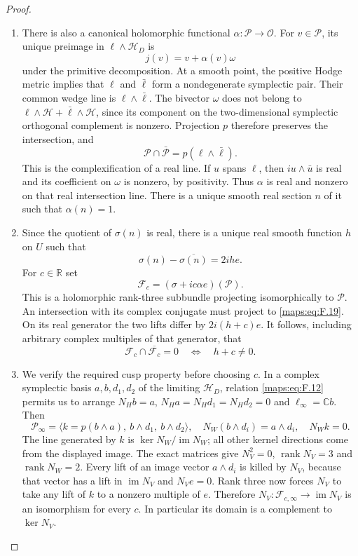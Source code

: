 \documentclass[11pt,a4paper]{article}
\theoremstyle{definition}
\begin{document}
\begin{proof}
\begin{enumerate}[label=\arabic*.]
\item There is also a canonical holomorphic functional
$\alpha:\mathcal P\to\mathcal O$.
For $v\in\mathcal P$, its unique preimage in
$\ell\wedge\mathcal H_D$ is
\[
 j(v)=v+\alpha(v)\omega
 \tag{F.18}\label{maps:eq:F.18}
\]
under the primitive decomposition.
At a smooth point, the positive Hodge metric implies that
$\ell$ and $\bar\ell$ form a nondegenerate symplectic pair.
Their common wedge line is $\ell\wedge\bar\ell$.
The bivector $\omega$ does not belong to
$\ell\wedge\mathcal H+\bar\ell\wedge\mathcal H$, since its
component on the two-dimensional symplectic orthogonal complement
is nonzero.  Projection $p$ therefore preserves the intersection,
and
\[
 \mathcal P\cap\bar{\mathcal P}
      =p(\ell\wedge\bar\ell).
 \tag{F.19}\label{maps:eq:F.19}
\]
This is the complexification of a real line.  If $u$ spans
$\ell$, then $i u\wedge\bar u$ is real and its coefficient on
$\omega$ is nonzero, by positivity.  Thus $\alpha$ is real and
nonzero on that real intersection line.  There is a unique smooth
real section $n$ of it such that $\alpha(n)=1$.

\item Since the quotient of $\sigma(n)$ is real, there is a unique
real smooth function $h$ on $U$ such that
\[
 \sigma(n)-\overline{\sigma(n)}=2ih e.
 \tag{F.20}\label{maps:eq:F.20}
\]
For $c\in\mathbb R$ set
\[
 \mathcal F_c=(\sigma+ic\alpha e)(\mathcal P).
 \tag{F.21}\label{maps:eq:F.21}
\]
This is a holomorphic rank-three subbundle projecting
isomorphically to $\mathcal P$.  An intersection with its complex
conjugate must project to \eqref{maps:eq:F.19}.  On its real generator the two
lifts differ by $2i(h+c)e$.  It follows, including arbitrary
complex multiples of that generator, that
\[
 \mathcal F_c\cap\overline{\mathcal F_c}=0
       \quad\Longleftrightarrow\quad h+c\ne0.
 \tag{F.22}\label{maps:eq:F.22}
\]

\item We verify the required cusp property before choosing $c$.
In a complex symplectic basis $a,b,d_1,d_2$ of the limiting
$\mathcal H_D$, relation \eqref{maps:eq:F.12} permits us to arrange
$N_Hb=a$, $N_Ha=N_Hd_1=N_Hd_2=0$ and $\ell_\infty=\mathbb Cb$.
Then
\[
 \mathcal P_\infty=
 \langle k=p(b\wedge a),\ b\wedge d_1,\ b\wedge d_2\rangle,
 \quad
 N_W(b\wedge d_i)=a\wedge d_i,
 \quad N_Wk=0.
 \tag{F.23}\label{maps:eq:F.23}
\]
The line generated by $k$ is
$\ker N_W/\operatorname{im}N_W$; all other kernel directions
come from the displayed image.  The exact matrices give
$N_V^2=0$, $\operatorname{rank}N_V=3$ and
$\operatorname{rank}N_W=2$.
Every lift of an image vector $a\wedge d_i$ is killed by $N_V$,
because that vector has a lift in $\operatorname{im}N_V$ and
$N_Ve=0$.  Rank three now forces $N_V$ to take any lift of $k$
to a nonzero multiple of $e$.  Therefore
$N_V:\mathcal F_{c,\infty}\to\operatorname{im}N_V$ is an
isomorphism for every $c$.  In particular its domain is a
complement to $\ker N_V$.


\end{enumerate}
\end{proof}
\end{document}
